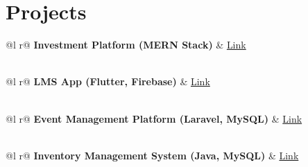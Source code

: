 \documentclass[a4paper,12pt]{article}
\begin{document}
\section{Projects}

\begin{tabularx}{\linewidth}{ @{}l r@{} }
\textbf{Investment Platform (MERN Stack)} & \hfill \href{https://github.com/richiebthomas/FinalSubmissionCodeCrafter}{Link \faGithub} \\[3.75pt]
 \\
\end{tabularx}

\begin{tabularx}{\linewidth}{ @{}l r@{} }
\textbf{LMS App (Flutter, Firebase)} & \hfill \href{https://github.com/richiebthomas/flutter_LMS_app}{Link \faGithub} \\[3.75pt]
 \\
\end{tabularx}

\begin{tabularx}{\linewidth}{ @{}l r@{} }
\textbf{Event Management Platform (Laravel, MySQL)} & \hfill \href{https://github.com/richiebthomas/yetamax}{Link \faGithub} \\[3.75pt]
 \\
\end{tabularx}

\begin{tabularx}{\linewidth}{ @{}l r@{} }
\textbf{Inventory Management System (Java, MySQL)} & \hfill \href{https://github.com/richiebthomas/sellsage}{Link \faGithub} \\[3.75pt]
 \\
\end{tabularx}

\end{document}
